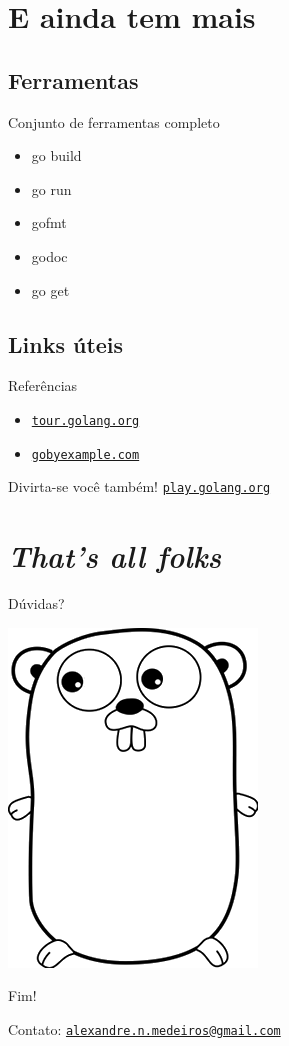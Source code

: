 \documentclass{beamer}
\newcommand{\link}[1]{\href{http://#1}{\tt #1}}
\newcommand{\email}[1]{\href{mailto:#1}{\tt #1}}
\begin{document}
\section{E ainda tem mais}
\subsection{Ferramentas}
\begin{frame}
    {Conjunto de ferramentas completo}
    \begin{itemize}[<+->]
        \item go build
        \item go run
        \item gofmt
        \item godoc
        \item go get
    \end{itemize}
\end{frame}

\subsection{Links úteis}
\begin{frame}
    {Referências}
    \begin{itemize}
        \item \link{tour.golang.org}
        \item \link{gobyexample.com}
    \end{itemize}
\end{frame}

\begin{frame}
    {Divirta-se você também!}
    \centering
    \link{play.golang.org}
\end{frame}

\section{\em That's all folks}
\begin{frame}
    \centering
    \Large
    Dúvidas?

    \vfill
    \includegraphics[width=.2\textwidth]{frontpage.png}
\end{frame}

\begin{frame}
    \centering
    \Large
    Fim!

    \vspace{20pt}
    \normalsize
    Contato: \email{alexandre.n.medeiros@gmail.com}
\end{frame}
\end{document}
